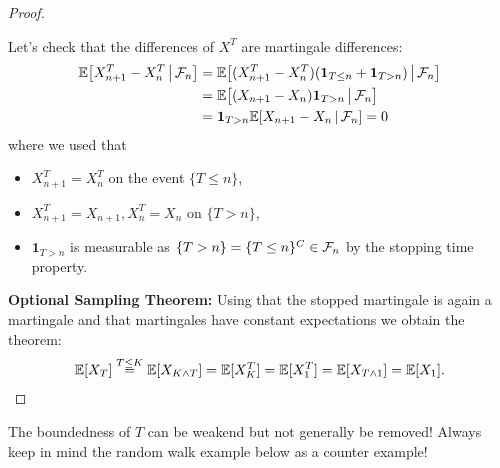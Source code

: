 \begin{proof}[Proof]
\begin{itemize}
				Let's check that the differences of $X^T$ are martingale differences:
					\begin{align*}
						\mathbb{E}\big[X_{n+1}^T-X_n^T\,\big|\,\mathcal{F}_n\big] &= \mathbb{E} \big[ (X^T_{n+1}-X^T_n)(\mathbf 1_{T\leq n}+\mathbf 1_{T > n})\,\big|\,\mathcal{F}_n\big] \\
						&= \mathbb{E}\big[(X_{n+1}-X_n) \mathbf 1_{T > n}\,\big|\,\mathcal{F}_n\big] \\
						&= \mathbf 1_{T>n} \mathbb{E}[X_{n+1}-X_n\,|\,\mathcal{F}_n] 
						= 0
					\end{align*}
					where we used that
					\begin{itemize}
						\item
							$X_{n+1}^T=X_n^T$ on the event $\lbrace T \leq n \rbrace$,
						\item
							$X_{n+1}^T = X_{n+1}, X_n^T = X_n$ on $\lbrace T > n \rbrace$,
						\item
							$\mathbf 1_{T>n}$ is measurable as $\lbrace T>n \rbrace = \lbrace T\leq n\rbrace^C \in \mathcal{F}_n$ by the stopping time property.
					\end{itemize}
			\end{itemize}
			
			\textbf{Optional Sampling Theorem:} 
			Using that the stopped martingale is again a martingale and that martingales have constant expectations we obtain the theorem:
			\begin{align*}
				\mathbb{E}[X_T] \overset{T\leq K}{=} \mathbb{E}[X_{K\wedge T}] =\mathbb{E}[X_{K}^T]=\mathbb{E}[X_1^T] = \mathbb{E}[X_{T \wedge 1}] = \mathbb{E}[X_1].
			\end{align*}				
\end{proof}
\begin{lwarnhinweis}
	The boundedness of $T$ can be weakend but not generally be removed! Always keep in mind the random walk example below as a counter example!
\end{lwarnhinweis}

